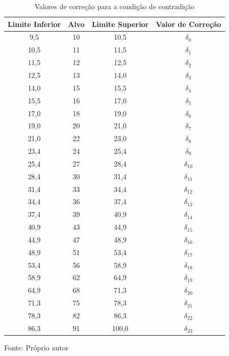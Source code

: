 \begin{table}[h]
\centering
\caption{Valores de correção para a condição de contradição}
\label{tab:correcaoDelta}

\begin{tabular}{c|c|c||c}
\hline
Limite Inferior & Alvo & Limite Superior & Valor de Correção\\ \hline
\hline
 9,5 & 10 & 10,5 & $\delta_0$ \\ \hline
10,5 & 11 & 11,5 & $\delta_1$ \\ \hline
11,5 & 12 & 12,5 & $\delta_2$ \\ \hline
12,5 & 13 & 14,0 & $\delta_3$ \\ \hline
14,0 & 15 & 15,5 & $\delta_4$ \\ \hline
15,5 & 16 & 17,0 & $\delta_5$ \\ \hline
17,0 & 18 & 19,0 & $\delta_6$ \\ \hline
19,0 & 20 & 21,0 & $\delta_7$ \\ \hline
21,0 & 22 & 23,0 & $\delta_8$ \\ \hline
23,4 & 24 & 25,4 & $\delta_9$ \\ \hline
25,4 & 27 & 28,4 & $\delta_{10}$ \\ \hline
28,4 & 30 & 31,4 & $\delta_{11}$ \\ \hline
31,4 & 33 & 34,4 & $\delta_{12}$ \\ \hline
34,4 & 36 & 37,4 & $\delta_{13}$ \\ \hline
37,4 & 39 & 40,9 & $\delta_{14}$ \\ \hline
40,9 & 43 & 44,9 & $\delta_{15}$ \\ \hline
44,9 & 47 & 48,9 & $\delta_{16}$ \\ \hline
48,9 & 51 & 53,4 & $\delta_{17}$ \\ \hline
53,4 & 56 & 58,9 & $\delta_{18}$ \\ \hline
58,9 & 62 & 64,9 & $\delta_{19}$ \\ \hline
64,9 & 68 & 71,3 & $\delta_{20}$ \\ \hline
71,3 & 75 & 78,3 & $\delta_{21}$ \\ \hline
78,3 & 82 & 86,3 & $\delta_{22}$ \\ \hline
86,3 & 91 &100,0 & $\delta_{23}$ \\ \hline

\end{tabular}

{\vspace{0.2cm} \small Fonte: Próprio autor}
\end{table}


